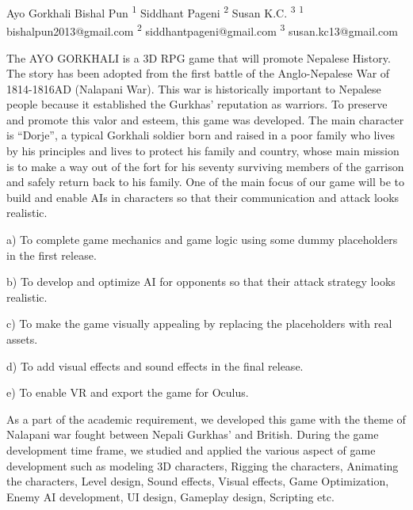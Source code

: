  \begin{conf-abstract}[]
 {Ayo Gorkhali }
 {Bishal Pun \textsuperscript{1}
 	Siddhant Pageni \textsuperscript{2}
 	Susan K.C. \textsuperscript{3}
 }
{\textsuperscript{1} bishalpun2013@gmail.com 
	\textsuperscript{2} siddhantpageni@gmail.com 
	\textsuperscript{3} susan.kc13@gmail.com}

The AYO GORKHALI is a 3D RPG game that will promote Nepalese History. The story has been adopted from the first battle of the Anglo-Nepalese War of 1814-1816AD (Nalapani War). This war is historically important to Nepalese people because it established the Gurkhas’ reputation as warriors. To preserve and promote this valor and esteem, this game was developed. The main character is “Dorje”, a typical Gorkhali soldier born and raised in a poor family who lives by his principles and lives to protect his family and country, whose main mission is to make a way out of the fort for his seventy surviving members of the garrison and safely return back to his family. One of the main focus of our game will be to build and enable AIs in characters so that their communication and attack looks realistic.

a)    To complete game mechanics and game logic using some dummy placeholders in the first release.

b)    To develop and optimize AI for opponents so that their attack strategy looks realistic.

c)    To make the game visually appealing by replacing the placeholders with real assets.

d)    To add visual effects and sound effects in the final release.

e)    To enable VR and export the game for Oculus.

As a part of the academic requirement, we developed this game with the theme of Nalapani war fought between Nepali Gurkhas' and British. During the game development time frame, we studied and applied the various aspect of game development such as modeling 3D characters, Rigging the characters, Animating the characters, Level design, Sound effects, Visual effects, Game Optimization, Enemy AI development, UI design, Gameplay design, Scripting etc. 


 \end{conf-abstract}

